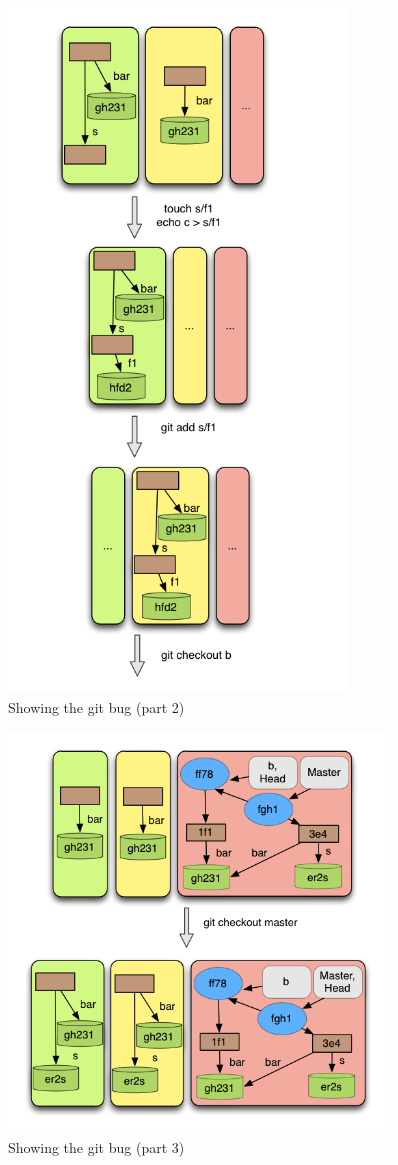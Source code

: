 \begin{figure}[tp]
   \centering
   \includegraphics[width=0.8\textwidth]{images/gitbug2.png}
   \caption{Showing the git bug (part 2)}\label{fig:gitbug2}
\end{figure}
\begin{figure}[tp]
   \centering
   \includegraphics[width=0.9\textwidth]{images/gitbug3.png}
   \caption{Showing the git bug (part 3)}\label{fig:gitbug3}
\end{figure}

